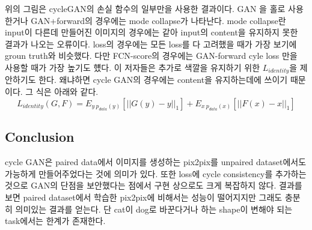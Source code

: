 \documentclass[extendedabs]{bmvc2k}
\begin{document}
위의 그림은 cycleGAN의 손실 함수의 일부만을 사용한 결과이다. GAN 을 홀로 사용한거나 GAN+forward의 경우에는 mode collapse가 나타난다. mode collapse란 input이 다른데 만들어진 이미지의 경우에는
같아 input의 content을 유지하지 못한 결과가 나오는 오류이다. loss의 경우에는 모든 loss를 다 고려했을 때가 가장 보기에 groun truth와 비슷했다. 다만 FCN-score의 경우에는
GAN-forward cyle loss 만을 사용할 때가 가장 높기도 헀다. 이 저자들은 추가로 색깔을 유지하기 위한 $L_{identity}$을 제안하기도 한다. 왜냐하면 cycle GAN의 경우에는 content을 유지하는데에 쓰이기 때문이다.
그 식은 아래와 같다.
$$ L_{identity}(G,F) = E_{y~p_{data}(y)}[||G(y)-y||_1] + E_{x~p_{data}(x)}[||F(x)-x||_1]$$

\subsection{Conclusion}
\quad cycle GAN은 paired data에서 이미지를 생성하는 pix2pix를 unpaired dataset에서도 가능하게 만들어주었다는 것에 의미가 있다. 또한 loss에 cycle consistency를 추가하는 것으로 GAN의 단점을 보안했다는 점에서
구현 상으로도 크게 복잡하지 않다. 결과를 보면 paired dataset에서 학습한 pix2pix에 비해서는 성능이 떨어지지만 그래도 충분히 의미있는 결과를 얻는다.
단 cat이 dog로 바꾼다거나 하는 shape이 변해야 되는 task에서는 한계가 존재한다. 
\newpage

\end{document}
